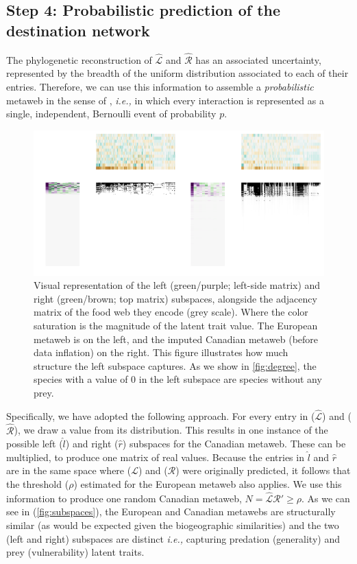 \begin{refsection}
\subsection{Step 4: Probabilistic prediction of the destination
network}\label{step-4-probabilistic-prediction-of-the-destination-network}

The phylogenetic reconstruction of \(\hat{\mathscr{L}}\) and
\(\hat{\mathscr{R}}\) has an associated uncertainty, represented by the
breadth of the uniform distribution associated to each of their entries.
Therefore, we can use this information to assemble a
\emph{probabilistic} metaweb in the sense of \cite{Poisot2016Structure},
\emph{i.e.,} in which every interaction is represented as a single,
independent, Bernoulli event of probability \(p\).

\begin{figure}[h]
    \centering
    \includegraphics[width=\textwidth]{figures/figure-subspaces.png}
    \caption{Visual representation of the left (green/purple; left-side
matrix) and right (green/brown; top matrix) subspaces, alongside the
adjacency matrix of the food web they encode (grey scale). Where the
color saturation is the magnitude of the latent trait value. The
European metaweb is on the left, and the imputed Canadian metaweb
(before data inflation) on the right. This figure illustrates how much
structure the left subspace captures. As we show in \autoref{fig:degree}, the
species with a value of 0 in the left subspace are species without any
prey.}
    \label{fig:subspaces}
\end{figure}

Specifically, we have adopted the following approach. For every entry in
($\hat{\mathscr{L}}$) and ($\hat{\mathscr{R}}$), we draw a value from
its distribution. This results in one instance of the possible left
($\hat{l}$) and right ($\hat{r}$) subspaces for
the Canadian metaweb. These can be multiplied, to produce one matrix of
real values. Because the entries in $\hat{l}$ and
$\hat{r}$ are in the same space where ($\mathscr{L}$) and
($\mathscr{R}$) were originally predicted, it follows that the threshold
($\rho$) estimated for the European metaweb also applies. We use this
information to produce one random Canadian metaweb,
\(N = \hat{\mathscr{L}}\hat{\mathscr{R}}' \ge \rho\). As we can see in
(\autoref{fig:subspaces}), the European and Canadian metawebs are structurally
similar (as would be expected given the biogeographic similarities) and
the two (left and right) subspaces are distinct \emph{i.e.,} capturing
predation (generality) and prey (vulnerability) latent traits.


\end{refsection}
